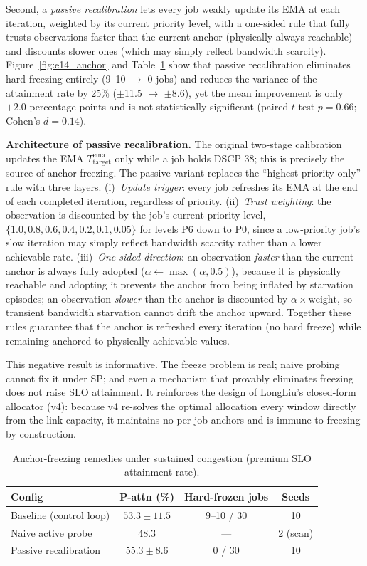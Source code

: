 Second, a \emph{passive recalibration} lets every job weakly update its EMA at each iteration, weighted by its current priority level, with a one-sided rule that fully trusts observations faster than the current anchor (physically always reachable) and discounts slower ones (which may simply reflect bandwidth scarcity). Figure~\ref{fig:e14_anchor} and Table~\ref{tab:e14_anchor} show that passive recalibration eliminates hard freezing entirely (9--10 $\rightarrow$ 0 jobs) and reduces the variance of the attainment rate by 25\% ($\pm$11.5 $\rightarrow$ $\pm$8.6), yet the mean improvement is only $+2.0$ percentage points and is not statistically significant (paired $t$-test $p=0.66$; Cohen's $d=0.14$).

\textbf{Architecture of passive recalibration.} The original two-stage calibration updates the EMA $T_{\mathrm{target}}^{\mathrm{ema}}$ only while a job holds DSCP 38; this is precisely the source of anchor freezing. The passive variant replaces the ``highest-priority-only'' rule with three layers. (i)~\emph{Update trigger}: every job refreshes its EMA at the end of each completed iteration, regardless of priority. (ii)~\emph{Trust weighting}: the observation is discounted by the job's current priority level, $\{1.0, 0.8, 0.6, 0.4, 0.2, 0.1, 0.05\}$ for levels P6 down to P0, since a low-priority job's slow iteration may simply reflect bandwidth scarcity rather than a lower achievable rate. (iii)~\emph{One-sided direction}: an observation \emph{faster} than the current anchor is always fully adopted ($\alpha \leftarrow \max(\alpha, 0.5)$), because it is physically reachable and adopting it prevents the anchor from being inflated by starvation episodes; an observation \emph{slower} than the anchor is discounted by $\alpha \times \mathrm{weight}$, so transient bandwidth starvation cannot drift the anchor upward. Together these rules guarantee that the anchor is refreshed every iteration (no hard freeze) while remaining anchored to physically achievable values.

This negative result is informative. The freeze problem is real; naive probing cannot fix it under SP; and even a mechanism that provably eliminates freezing does not raise SLO attainment. It reinforces the design of LongLiu's closed-form allocator (v4): because v4 re-solves the optimal allocation every window directly from the link capacity, it maintains no per-job anchors and is immune to freezing by construction.

\begin{table}[t]
\centering
\caption{Anchor-freezing remedies under sustained congestion (premium SLO attainment rate).}
\label{tab:e14_anchor}
\begin{tabular}{lccc}
\toprule
\textbf{Config} & \textbf{P-attn (\%)} & \textbf{Hard-frozen jobs} & \textbf{Seeds} \\
\midrule
Baseline (control loop) & $53.3\pm11.5$ & 9--10 / 30 & 10 \\
Naive active probe & 48.3 & --- & 2 (scan) \\
Passive recalibration & $55.3\pm8.6$ & 0 / 30 & 10 \\
\bottomrule
\end{tabular}
\end{table}
